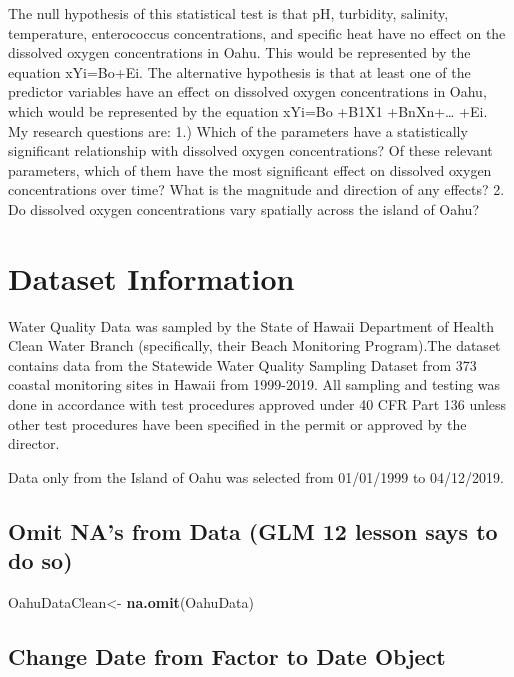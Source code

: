 \documentclass[12pt,]{article}
\newenvironment{Shaded}{\begin{snugshade}}{\end{snugshade}}
\newcommand{\KeywordTok}[1]{\textcolor[rgb]{0.13,0.29,0.53}{\textbf{#1}}}
\newcommand{\StringTok}[1]{\textcolor[rgb]{0.31,0.60,0.02}{#1}}
\newcommand{\NormalTok}[1]{#1}
\begin{document}
The null hypothesis of this statistical test is that pH, turbidity,
salinity, temperature, enterococcus concentrations, and specific heat
have no effect on the dissolved oxygen concentrations in Oahu. This
would be represented by the equation xYi=Bo+Ei. The alternative
hypothesis is that at least one of the predictor variables have an
effect on dissolved oxygen concentrations in Oahu, which would be
represented by the equation xYi=Bo +B1X1 +BnXn+\ldots{} +Ei. My research
questions are: 1.) Which of the parameters have a statistically
significant relationship with dissolved oxygen concentrations? Of these
relevant parameters, which of them have the most significant effect on
dissolved oxygen concentrations over time? What is the magnitude and
direction of any effects? 2. Do dissolved oxygen concentrations vary
spatially across the island of Oahu?

\newpage

\section{Dataset Information}\label{dataset-information-1}

Water Quality Data was sampled by the State of Hawaii Department of
Health Clean Water Branch (specifically, their Beach Monitoring
Program).The dataset contains data from the Statewide Water Quality
Sampling Dataset from 373 coastal monitoring sites in Hawaii from
1999-2019. All sampling and testing was done in accordance with test
procedures approved under 40 CFR Part 136 unless other test procedures
have been specified in the permit or approved by the director.

Data only from the Island of Oahu was selected from 01/01/1999 to
04/12/2019.

\subsection{Omit NA's from Data (GLM 12 lesson says to do
so)}\label{omit-nas-from-data-glm-12-lesson-says-to-do-so}

\begin{Shaded}
\begin{Highlighting}[]
\NormalTok{OahuDataClean<-}\StringTok{ }\KeywordTok{na.omit}\NormalTok{(OahuData) }
\end{Highlighting}
\end{Shaded}

\subsection{Change Date from Factor to Date
Object}\label{change-date-from-factor-to-date-object}
\end{document}
